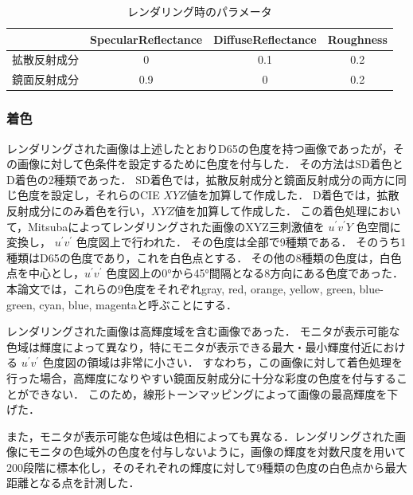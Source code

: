             \begin{table}[h]
                \centering
                \caption{レンダリング時のパラメータ}
                \begin{tabular}{|l||c|c|c|} \hline
                                           & SpecularReflectance & DiffuseReflectance & Roughness \\ \hline \hline
                    拡散反射成分           & 0                   & 0.1                & 0.2 \\ \hline
                    鏡面反射成分           & 0.9                 & 0                  & 0.2 \\ \hline
                \end{tabular}
                \label{render_param}
            \end{table}
        
        \subsubsection{着色}

            レンダリングされた画像は上述したとおりD65の色度を持つ画像であったが，その画像に対して色条件を設定するために色度を付与した．
            その方法はSD着色とD着色の2種類であった．
            SD着色では，拡散反射成分と鏡面反射成分の両方に同じ色度を設定し，それらのCIE $XYZ$値を加算して作成した．
            D着色では，拡散反射成分にのみ着色を行い，$XYZ$値を加算して作成した．
            この着色処理において，Mitsubaによってレンダリングされた画像のXYZ三刺激値を $u^{\prime}v^{\prime}Y$ 色空間に変換し， $u^{\prime}v^{\prime}$ 色度図上で行われた．
            その色度は全部で9種類である．
            そのうち1種類はD65の色度であり，これを白色点とする．
            その他の8種類の色度は，白色点を中心とし，$u^{\prime}v^{\prime}$ 色度図上の0°から45°間隔となる8方向にある色度であった．
            本論文では，これらの9色度をそれぞれgray, red, orange, yellow, green, blue-green, cyan, blue, magentaと呼ぶことにする．

            レンダリングされた画像は高輝度域を含む画像であった．
            モニタが表示可能な色域は輝度によって異なり，特にモニタが表示できる最大・最小輝度付近における $u^{\prime}v^{\prime}$ 色度図の領域は非常に小さい．
            すなわち，この画像に対して着色処理を行った場合，高輝度になりやすい鏡面反射成分に十分な彩度の色度を付与することができない．
            このため，線形トーンマッピングによって画像の最高輝度を下げた．

            また，モニタが表示可能な色域は色相によっても異なる．レンダリングされた画像にモニタの色域外の色度を付与しないように，画像の輝度を対数尺度を用いて200段階に標本化し，そのそれぞれの輝度に対して9種類の色度の白色点から最大距離となる点を計測した．


